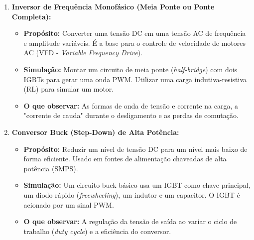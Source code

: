 \documentclass[12pt]{article}
\begin{document}
        \begin{enumerate}
            \item \textbf{Inversor de Frequência Monofásico (Meia Ponte ou Ponte Completa):}
            \begin{itemize}
                \item \textbf{Propósito:} Converter uma tensão DC em uma tensão AC de frequência e amplitude variáveis. É a base para o controle de velocidade de motores AC (VFD - \textit{Variable Frequency Drive}).
                \item \textbf{Simulação:} Montar um circuito de meia ponte (\textit{half-bridge}) com dois IGBTs para gerar uma onda PWM. Utilizar uma carga indutiva-resistiva (RL) para simular um motor.
                \item \textbf{O que observar:} As formas de onda de tensão e corrente na carga, a "corrente de cauda" durante o desligamento e as perdas de comutação.
            \end{itemize}

            \item \textbf{Conversor Buck (Step-Down) de Alta Potência:}
            \begin{itemize}
                \item \textbf{Propósito:} Reduzir um nível de tensão DC para um nível mais baixo de forma eficiente. Usado em fontes de alimentação chaveadas de alta potência (SMPS).
                \item \textbf{Simulação:} Um circuito buck básico usa um IGBT como chave principal, um diodo rápido (\textit{freewheeling}), um indutor e um capacitor. O IGBT é acionado por um sinal PWM.
                \item \textbf{O que observar:} A regulação da tensão de saída ao variar o ciclo de trabalho (\textit{duty cycle}) e a eficiência do conversor.
            \end{itemize}


\end{enumerate}
\end{document}
